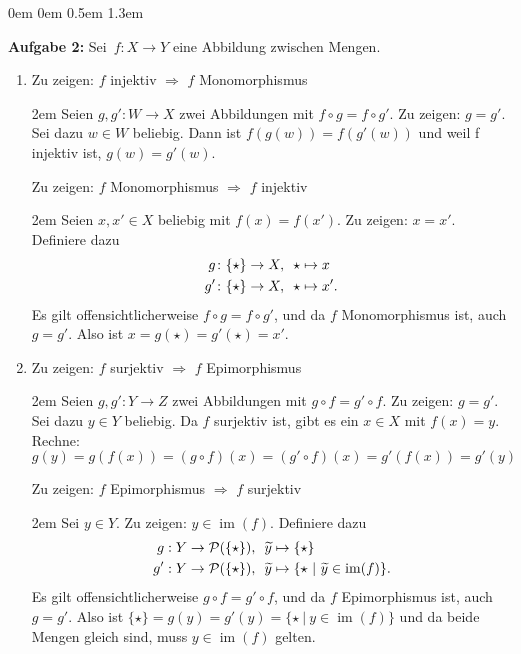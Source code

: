 \documentclass[a4paper,ngerman]{scrartcl}
\theoremstyle{definition}
\theoremstyle{plain}
\theoremstyle{remark}
\DeclareMathOperator{\Bild}{im}
\begin{document}
\begin{list}{}{0em \leftmargin0em \itemindent0.5em \itemsep 1.3em}
\item[\textbf{Aufgabe 2:}]
Sei~$f:X \to Y$ eine Abbildung zwischen Mengen.
\begin{enumerate}
\item Zu zeigen: $f$ injektiv $\Rightarrow$ $f$ Monomorphismus

  \begin{addmargin}{2em}
    Seien $g, g':W \to X$ zwei Abbildungen mit $f \circ g = f \circ g'$. Zu zeigen: $g = g'$.
    Sei dazu $w \in W$ beliebig. Dann ist $f(g(w)) = f(g'(w))$ und weil f injektiv ist,
    $g(w) = g'(w)$.
  \end{addmargin}

  Zu zeigen: $f$ Monomorphismus $\Rightarrow$ $f$ injektiv

  \begin{addmargin}{2em}
    Seien $x, x' \in X$ beliebig mit $f(x) = f(x')$. Zu zeigen: $x = x'$. Definiere dazu
    \begin{align*}
      g &\colon\{\star\} \to X, \enskip\star \mapsto x \\
      g' &\colon\{\star\} \to X, \enskip\star \mapsto x'.
    \end{align*}
    Es gilt offensichtlicherweise $f \circ g = f \circ g'$, und da $f$ Monomorphismus ist,
    auch $g = g'$. Also ist $x = g(\star) = g'(\star) = x'$.
  \end{addmargin}

\item Zu zeigen: $f$ surjektiv $\Rightarrow$ $f$ Epimorphismus

  \begin{addmargin}{2em}
    Seien $g, g':Y \to Z$ zwei Abbildungen mit $g \circ f = g' \circ f$. Zu zeigen: $g = g'$.
    Sei dazu $y \in Y$ beliebig. Da $f$ surjektiv ist, gibt es ein $x \in X$ mit $f(x) = y$. Rechne:
    $$g(y) = g(f(x)) = (g \circ f)(x) = (g' \circ f)(x) = g'(f(x)) = g'(y)$$
  \end{addmargin}

  Zu zeigen: $f$ Epimorphismus $\Rightarrow$ $f$ surjektiv

  \begin{addmargin}{2em}
    Sei $y \in Y$. Zu zeigen: $y \in \Bild(f)$. Definiere dazu
    \begin{align*}
      g&:Y \to \mathcal{P}(\{\star\}), \enskip\widetilde{y} \mapsto \{\star\} \\
      g'&:Y \to \mathcal{P}(\{\star\}), \enskip\widetilde{y} \mapsto \{\star~|~\widetilde{y} \in \Bild(f) \}.
    \end{align*}
    Es gilt offensichtlicherweise $g \circ f = g' \circ f$, und da $f$ Epimorphismus ist,
    auch $g = g'$. Also ist $\{\star\} = g(y) = g'(y) = \{\star~|~y \in \Bild(f)\}$ und da beide Mengen gleich sind, muss $y \in \Bild(f)$ gelten.
  \end{addmargin}
\end{enumerate}


\end{list}
\end{document}
